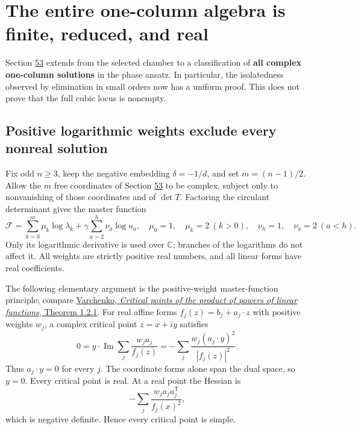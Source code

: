 \documentclass[11pt,reqno]{amsart}
\theoremstyle{plain}
\begin{document}
\section{The entire one-column algebra is finite, reduced, and real}\label{sec:54}

Section \hyperref[sec:53]{53} extends from the selected chamber to a classification of
\textbf{all complex one-column solutions} in the phase ansatz. In particular,
the isolatedness observed by elimination in small orders now has a
uniform proof. This does not prove that the full cubic locus is nonempty.

\subsection{Positive logarithmic weights exclude every nonreal solution}\label{sec:54.1}

Fix odd \(n\ge3\), keep the negative embedding \(\delta=-1/d\), and
set \(m=(n-1)/2\).
Allow the \(m\) free coordinates of Section \hyperref[sec:53]{53} to be complex, subject
only to nonvanishing of those coordinates and of \(\det T\).
Factoring the circulant determinant gives the master function
\begin{equation*}
 \mathcal F=\sum_{k=0}^{m}\mu_k\log\lambda_k
       +\gamma\sum_{a=2}^{h}\nu_a\log u_a,
 \quad \mu_0=1,\quad\mu_k=2\ (k>0),
 \quad\nu_h=1,\quad\nu_a=2\ (a<h).
 \tag{54.1}
\end{equation*}
Only its logarithmic derivative is used over \(\mathbb C\); branches
of the logarithms do not affect it. All weights are strictly positive
real numbers, and all linear forms have real coefficients.

The following elementary argument is the positive-weight master-function
principle; compare \href{https://www.numdam.org/item/CM_1995__97_3_385_0.pdf}{Varchenko, \emph{Critical points of the product of powers
of linear functions}, Theorem 1.2.1}.
For real affine forms \(f_j(z)=b_j+a_j\cdot z\) with positive weights
\(w_j\), a complex critical point \(z=x+iy\) satisfies
\begin{equation*}
 0=y\cdot\operatorname{Im}\sum_j\frac{w_j a_j}{f_j(z)}
   =-\sum_j\frac{w_j(a_j\cdot y)^2}{|f_j(z)|^2}.
 \tag{54.2}
\end{equation*}
Thus \(a_j\cdot y=0\) for every \(j\). The coordinate forms alone
span the dual space, so \(y=0\). Every critical point is real.
At a real point the Hessian is
\begin{equation*}
 -\sum_j\frac{w_j a_j a_j^{\mathsf T}}{f_j(x)^2},
 \tag{54.3}
\end{equation*}
which is negative definite. Hence every critical point is simple.
\end{document}
